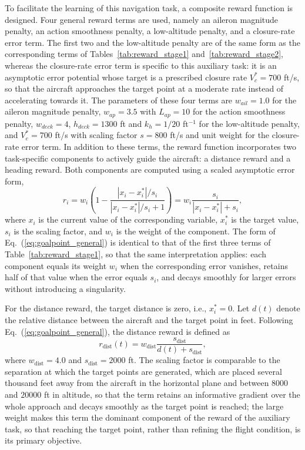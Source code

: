 \documentclass[pdflatex,sn-mathphys-num]{sn-jnl}%
\theoremstyle{thmstyleone}%
\theoremstyle{thmstyletwo}%
\theoremstyle{thmstylethree}%
\begin{document}
To facilitate the learning of this navigation task, a composite reward function is designed. 
Four general reward terms are used, namely an aileron magnitude penalty, an action smoothness penalty, a low-altitude penalty, and a closure-rate error term. The first two and the low-altitude penalty are of the same form as the corresponding terms of Tables~\ref{tab:reward_stage1} and~\ref{tab:reward_stage2}, whereas the closure-rate error term is specific to this auxiliary task: it is an asymptotic error potential whose target is a prescribed closure rate $V_{c}^{\ast} = 700$ ft/s, so that the aircraft approaches the target point at a moderate rate instead of accelerating towards it. The parameters of these four terms are $w_{ail}=1.0$ for the aileron magnitude penalty, $w_{ap}=3.5$ with $L_{ap}=10$ for the action smoothness penalty, $w_{deck}=4$, $h_{deck}=1300$ ft and $k_{h}=1/20$ ft$^{-1}$ for the low-altitude penalty, and $V_{c}^{\ast}=700$ ft/s with scaling factor $s=800$ ft/s and unit weight for the closure-rate error term.
In addition to these terms, the reward function incorporates two task-specific components to actively guide the aircraft: a distance reward and a heading reward. 
Both components are computed using a scaled asymptotic error form,
\begin{equation}
    r_i = w_i \left(1 - \frac{|x_i - x_i^\ast|/s_i}{|x_i - x_i^\ast|/s_i + 1}\right)
        = w_i \frac{s_i}{|x_i - x_i^\ast| + s_i},
    \label{eq:goalpoint_general}
\end{equation}
where $x_i$ is the current value of the corresponding variable, $x_i^\ast$ is the target value, $s_i$ is the scaling factor, and $w_i$ is the weight of the component. The form of Eq.~(\ref{eq:goalpoint_general}) is identical to that of the first three terms of Table~\ref{tab:reward_stage1}, so that the same interpretation applies: each component equals its weight $w_i$ when the corresponding error vanishes, retains half of that value when the error equals $s_i$, and decays smoothly for larger errors without introducing a singularity.

For the distance reward, the target distance is zero, i.e., $x_i^\ast=0$. Let $d(t)$ denote the relative distance between the aircraft and the target point in feet. Following Eq.~(\ref{eq:goalpoint_general}), the distance reward is defined as
\begin{equation}
    r_{\mathrm{dist}}(t) = w_{\mathrm{dist}}\frac{s_{\mathrm{dist}}}{d(t) + s_{\mathrm{dist}}},
    \label{eq:goalpoint_dist}
\end{equation}
where $w_{\mathrm{dist}} = 4.0$ and $s_{\mathrm{dist}} = 2000$ ft. The scaling factor is comparable to the separation at which the target points are generated, which are placed several thousand feet away from the aircraft in the horizontal plane and between $8000$ and $20000$ ft in altitude, so that the term retains an informative gradient over the whole approach and decays smoothly as the target point is reached; the large weight makes this term the dominant component of the reward of the auxiliary task, so that reaching the target point, rather than refining the flight condition, is its primary objective.
\end{document}
